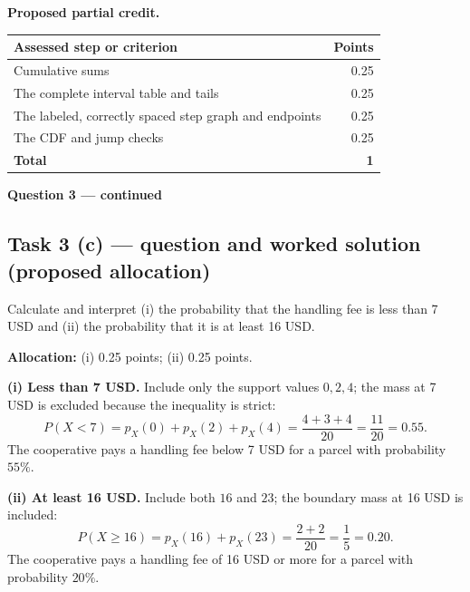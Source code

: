 \par\smallskip
\noindent\begin{minipage}{\linewidth}
\textbf{Proposed partial credit.}\par\smallskip
\begin{tabularx}{\linewidth}{@{}>{\raggedright\arraybackslash}X r@{}}\toprule
\textbf{Assessed step or criterion} & \textbf{Points}\\\midrule
Cumulative sums & 0.25\\
The complete interval table and tails & 0.25\\
The labeled, correctly spaced step graph and endpoints & 0.25\\
The CDF and jump checks & 0.25\\
\midrule
\textbf{Total} & \textbf{1}\\
\bottomrule\end{tabularx}
\end{minipage}\par\smallskip

\par\vspace{3mm}\secInicio[][sec:q3]

\clearpage
\textbf{Question 3 --- continued}

\subsection*{Task 3 (c) --- question and worked solution (proposed allocation) }
\label{sol:q3t3}

Calculate and interpret (i) the probability that the handling fee is less than 7 USD and (ii) the probability that it is at least 16 USD.

\textbf{Allocation:} (i) 0.25 points; (ii) 0.25 points.

\textbf{(i) Less than 7 USD.} Include only the support values $0,2,4$; the mass at 7 USD is excluded because the inequality is strict:
\[
P(X<7)=p_X(0)+p_X(2)+p_X(4)
=\frac{4+3+4}{20}=\frac{11}{20}=0.55.
\]
The cooperative pays a handling fee below 7 USD for a parcel with probability $55\%$.

\textbf{(ii) At least 16 USD.} Include both $16$ and $23$; the boundary mass at 16 USD is included:
\[
P(X\geq16)=p_X(16)+p_X(23)=\frac{2+2}{20}=\frac15=0.20.
\]
The cooperative pays a handling fee of 16 USD or more for a parcel with probability $20\%$.

